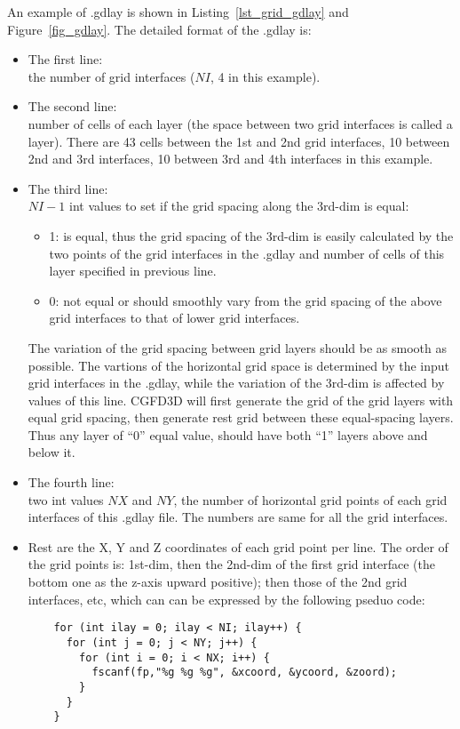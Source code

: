 An example of .gdlay is shown in Listing~\ref{lst_grid_gdlay} and Figure~\ref{fig_gdlay}.
The detailed format of the .gdlay is:
\begin{itemize}
  \item The first line: \\
    the number of grid interfaces ($NI$, 4 in this example).
  \item The second line: \\
    number of cells of each layer
      (the space between two grid interfaces is called a layer).
    There are 43 cells between the 1st and 2nd grid interfaces,
      10 between 2nd and 3rd interfaces,
      10 between 3rd and 4th interfaces in this example.
 \item The third line: \\
   $NI-1$ int values to set if the grid spacing along the 3rd-dim is equal:
   \begin{itemize}
     \item 1: is equal, thus the grid spacing of the 3rd-dim is easily calculated by the two points
         of the grid interfaces in the .gdlay and number of cells of this layer specified in previous line.
     \item 0: not equal or should smoothly vary from 
          the grid spacing of the above grid interfaces to that of lower grid interfaces.
   \end{itemize}
   The variation of the grid spacing between grid layers should be as smooth as possible.
   The vartions of the horizontal grid space is determined by the input grid interfaces in the .gdlay,
    while the variation of the 3rd-dim is affected by values of this line.
   CGFD3D will first generate the grid of the grid layers with equal grid spacing, 
   then generate rest grid between these equal-spacing layers.
   Thus any layer of ``0'' equal value, should have both ``1''  layers above and below it.
  \item The fourth line: \\
    two int values $NX$ and $NY$,
        the number of horizontal grid points of each grid interfaces 
         of this .gdlay file. The numbers are same for all the grid interfaces.
  \item 
    Rest are the X, Y and Z coordinates of each grid point per line.
    The order of the grid points is:
      1st-dim, then the 2nd-dim of the first grid interface (the bottom one as the z-axis upward positive);
      then those of the 2nd grid interfaces, etc,
    which can can be expressed by the following pseduo code:
\begin{verbatim}
    for (int ilay = 0; ilay < NI; ilay++) {
      for (int j = 0; j < NY; j++) {
        for (int i = 0; i < NX; i++) {
          fscanf(fp,"%g %g %g", &xcoord, &ycoord, &zoord);
        }
      }
    }
\end{verbatim}

\end{itemize}

